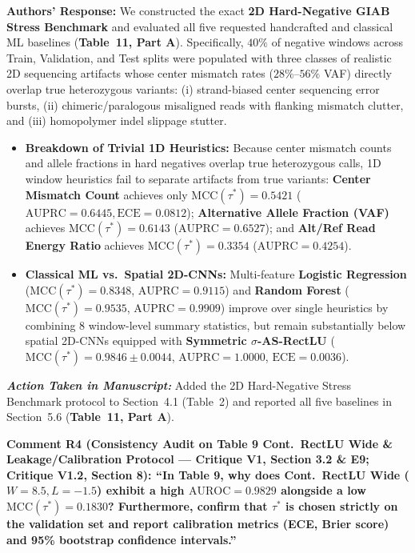 \documentclass[11pt,a4paper]{article}
\newcommand{\revcomment}[1]{\vspace{0.8em}\noindent\textbf{\textcolor{blue!75!black}{#1}}\par\vspace{0.3em}}
\newcommand{\authorsresponse}{\noindent\textbf{Authors' Response: }}
\newcommand{\manuscriptchange}{\vspace{0.3em}\noindent\textit{\textbf{Action Taken in Manuscript: }}}
\begin{document}
\authorsresponse We constructed the exact \textbf{2D Hard-Negative GIAB Stress Benchmark} and evaluated all five requested handcrafted and classical ML baselines (\textbf{Table~11, Part A}). Specifically, $40\%$ of negative windows across Train, Validation, and Test splits were populated with three classes of realistic 2D sequencing artifacts whose center mismatch rates ($28\%$--$56\%$ VAF) directly overlap true heterozygous variants: (i) strand-biased center sequencing error bursts, (ii) chimeric/paralogous misaligned reads with flanking mismatch clutter, and (iii) homopolymer indel slippage stutter.
\begin{itemize}
    \item \textbf{Breakdown of Trivial 1D Heuristics:} Because center mismatch counts and allele fractions in hard negatives overlap true heterozygous calls, 1D window heuristics fail to separate artifacts from true variants: \textbf{Center Mismatch Count} achieves only $\text{MCC}(\tau^*) = 0.5421$ ($\text{AUPRC} = 0.6445, \text{ECE} = 0.0812$); \textbf{Alternative Allele Fraction (VAF)} achieves $\text{MCC}(\tau^*) = 0.6143$ ($\text{AUPRC} = 0.6527$); and \textbf{Alt/Ref Read Energy Ratio} achieves $\text{MCC}(\tau^*) = 0.3354$ ($\text{AUPRC} = 0.4254$).
    \item \textbf{Classical ML vs.\ Spatial 2D-CNNs:} Multi-feature \textbf{Logistic Regression} ($\text{MCC}(\tau^*) = 0.8348$, $\text{AUPRC} = 0.9115$) and \textbf{Random Forest} ($\text{MCC}(\tau^*) = 0.9535$, $\text{AUPRC} = 0.9909$) improve over single heuristics by combining 8 window-level summary statistics, but remain substantially below spatial 2D-CNNs equipped with \textbf{Symmetric $\sigma$-AS-RectLU} ($\text{MCC}(\tau^*) = \mathbf{0.9846 \pm 0.0044}$, $\text{AUPRC} = \mathbf{1.0000}$, $\text{ECE} = \mathbf{0.0036}$).
\end{itemize}

\manuscriptchange Added the 2D Hard-Negative Stress Benchmark protocol to Section~4.1 (Table~2) and reported all five baselines in Section~5.6 (\textbf{Table~11, Part A}).

\revcomment{Comment R4 (Consistency Audit on Table 9 Cont.\ RectLU Wide \& Leakage/Calibration Protocol --- Critique V1, Section 3.2 \& E9; Critique V1.2, Section 8):
``In Table 9, why does Cont.\ RectLU Wide ($W=8.5, L=-1.5$) exhibit a high $\text{AUROC} = 0.9829$ alongside a low $\text{MCC}(\tau^*) = 0.1830$? Furthermore, confirm that $\tau^*$ is chosen strictly on the validation set and report calibration metrics (ECE, Brier score) and 95\% bootstrap confidence intervals.''}
\end{document}
